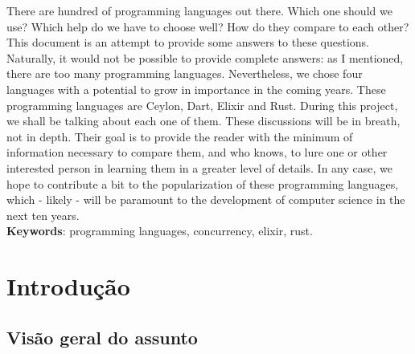 \documentclass{abnt}
\begin{document}





 

\capa
\folhaderosto

\begin{resumo}
There are hundred of programming languages out there. Which one should we use?
Which help do we have to choose well? How do they compare to each other? This
document is an attempt to provide some answers to these questions. Naturally, it
would not be possible to provide complete answers: as I mentioned, there are too
many programming languages. Nevertheless, we chose four languages with a
potential to grow in importance in the coming years. These programming languages
are Ceylon, Dart, Elixir and Rust. During this project, we shall be
talking about each one of them. These discussions will be in breath, not in
depth. Their goal is to provide the reader with the minimum of information
necessary to compare them, and who knows, to lure one or other interested person
in learning them in a greater level of details. In any case, we hope to
contribute a bit to the popularization of these programming languages, which -
likely - will be paramount to the development of computer science in the next
ten years.\\

\textbf{Keywords}: programming languages, concurrency, elixir, rust.
\end{resumo}

\sumario
\listoffigures

\chapter{Introdução}
\section{Visão geral do assunto}
\end{document}

